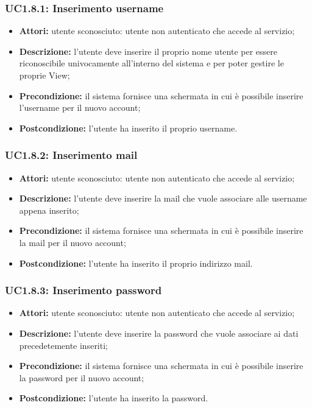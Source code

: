 \subsubsection{UC1.8.1: Inserimento username}

\begin{itemize}
   	\item \textbf{Attori:} utente sconosciuto: utente non autenticato che accede al servizio;
    \item \textbf{Descrizione:} l'utente deve inserire il proprio nome utente per essere riconoscibile univocamente all'interno del sistema e per poter gestire le proprie View;
    \item \textbf{Precondizione:} il sistema fornisce una schermata in cui è possibile inserire l'username per il nuovo account;
    \item \textbf{Postcondizione:} l'utente ha inserito il proprio username.
\end{itemize}

\subsubsection{UC1.8.2: Inserimento mail}

\begin{itemize}
   	\item \textbf{Attori:} utente sconosciuto: utente non autenticato che accede al servizio;
    \item \textbf{Descrizione:} l'utente deve inserire la mail che vuole associare alle username appena inserito;
    \item \textbf{Precondizione:} il sistema fornisce una schermata in cui è possibile inserire la mail per il nuovo account;
    \item \textbf{Postcondizione:} l'utente ha inserito il proprio indirizzo mail.
\end{itemize}

\subsubsection{UC1.8.3: Inserimento password}

\begin{itemize}
   	\item \textbf{Attori:} utente sconosciuto: utente non autenticato che accede al servizio;
    \item \textbf{Descrizione:} l'utente deve inserire la password che vuole associare ai dati precedetemente inseriti;
    \item \textbf{Precondizione:} il sistema fornisce una schermata in cui è possibile inserire la password per il nuovo account;
    \item \textbf{Postcondizione:} l'utente ha inserito la password.
\end{itemize}

